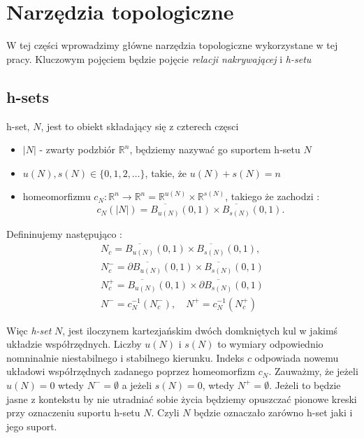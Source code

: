 
\section{Narzędzia topologiczne}
\label{sec:topmeth}

W tej części wprowadzimy główne narzędzia topologiczne wykorzystane w tej pracy.
Kluczowym pojęciem będzie pojęcie {\em relacji nakrywającej } i {\em h-setu} \cite{ZGi}

\subsection{h-sets}



\begin{definition} \cite{ZGi}
\label{def:covrel} h-set, $N$, jest to obiekt składający się z czterech
częsci
\begin{itemize}
 \item $|N|$  - zwarty podzbiór ${\mathbb R}^n$, będziemy nazywać go suportem h-setu $N$ %
 \item $u(N),s(N) \in \{0,1,2,\dots\}$, takie, że $u(N) + s(N) = n$ %
 \item homeomorfizmu $c_N:{\mathbb R}^n \to   
   {\mathbb R}^n={\mathbb R}^{u(N)} \times {\mathbb R}^{s(N)}$,
	 takiego że zachodzi : %
      \begin{displaymath}
        c_N(|N|)=\overline{B_{u(N)}}(0,1) \times
        \overline{B_{s(N)}}(0,1).
      \end{displaymath}
\end{itemize}
Defininujemy następująco : 
\begin{eqnarray*}
  N_c=\overline{B_{u(N)}}(0,1) \times \overline{B_{s(N)}}(0,1), \\
   N_c^-=\partial \overline{ B_{u(N)}}(0,1) \times
\overline{B_{s(N)}}(0,1) \\
N_c^+=\overline{B_{u(N)}}(0,1) \times
\partial \overline{B_{s(N)}}(0,1) \\
  N^-=c_N^{-1}(N_c^-) , \quad N^+=c_N^{-1}(N_c^+)
\end{eqnarray*}
\end{definition}

Więc {\em h-set }  $N$, jest iloczynem kartezjańskim dwóch domkniętych kul w jakimś
układzie współrzędnych. Liczby $u(N)$ i $s(N)$ to wymiary odpowiednio nomninalnie niestabilnego
i stabilnego kierunku. Indeks $c$ odpowiada nowemu układowi współrzędnych zadanego poprzez homeomorfizm
$c_N$. Zauważmy, że jeżeli $u(N) = 0$ wtedy $N^-=\emptyset$ a jeżeli $s(N)=0$, wtedy $N^+=\emptyset$.
Jeżeli to będzie jasne z kontekstu by nie utradniać sobie życia będziemy opuszczać pionowe kreski
przy oznaczeniu suportu h-setu $N$. Czyli $N$ będzie oznaczało zarówno h-set jaki i jego suport.

